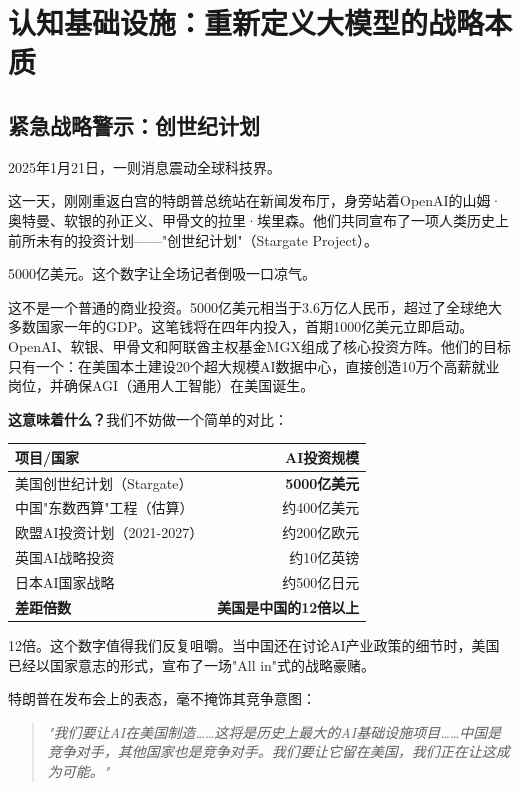 \chapter{认知基础设施：重新定义大模型的战略本质}

\section{紧急战略警示：创世纪计划}

2025年1月21日，一则消息震动全球科技界。

这一天，刚刚重返白宫的特朗普总统站在新闻发布厅，身旁站着OpenAI的山姆·奥特曼、软银的孙正义、甲骨文的拉里·埃里森。他们共同宣布了一项人类历史上前所未有的投资计划——"创世纪计划"（Stargate Project）。

5000亿美元。这个数字让全场记者倒吸一口凉气。

这不是一个普通的商业投资。5000亿美元相当于3.6万亿人民币，超过了全球绝大多数国家一年的GDP。这笔钱将在四年内投入，首期1000亿美元立即启动。OpenAI、软银、甲骨文和阿联酋主权基金MGX组成了核心投资方阵。他们的目标只有一个：在美国本土建设20个超大规模AI数据中心，直接创造10万个高薪就业岗位，并确保AGI（通用人工智能）在美国诞生。

\textbf{这意味着什么？}我们不妨做一个简单的对比：

\begin{center}
\begin{tabular}{p{6cm}r}
\toprule
\textbf{项目/国家} & \textbf{AI投资规模} \\
\midrule
美国创世纪计划（Stargate） & \textbf{5000亿美元} \\
中国"东数西算"工程（估算） & 约400亿美元 \\
欧盟AI投资计划（2021-2027） & 约200亿欧元 \\
英国AI战略投资 & 约10亿英镑 \\
日本AI国家战略 & 约500亿日元 \\
\midrule
\textbf{差距倍数} & \textbf{美国是中国的12倍以上} \\
\bottomrule
\end{tabular}
\end{center}

12倍。这个数字值得我们反复咀嚼。当中国还在讨论AI产业政策的细节时，美国已经以国家意志的形式，宣布了一场"All in"式的战略豪赌。

特朗普在发布会上的表态，毫不掩饰其竞争意图：
\begin{quote}
\textit{"我们要让AI在美国制造……这将是历史上最大的AI基础设施项目……中国是竞争对手，其他国家也是竞争对手。我们要让它留在美国，我们正在让这成为可能。"}
\end{quote}

